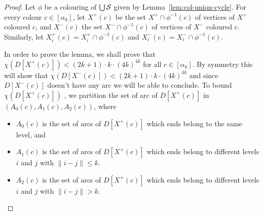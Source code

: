 \documentclass[utf8,10pt]{article}
\theoremstyle{plain}
\newtheorem{lemma}[theorem]{Lemma}
\theoremstyle{definition}
\theoremstyle{remark}
\newcommand{\dr}{ (2k+1)\cdot k \cdot (4k)^{4k}}
\begin{document}
\begin{proof}

%

Let $\phi$ be a colouring of $\bigcup {\cal S}$ given by Lemma~\ref{lem:col-union-cycle}.
For every colour $c\in [\alpha_k]$, let $X^+(c)$ be the set $X^+\cap \phi^{-1}(c)$ of vertices of $X^+$ coloured $c$, and $X^-(c)$ the set $X^-\cap \phi^{-1}(c)$ of vertices of $X^-$ coloured $c$. Similarly, let  $X^+_i(c)= X^+_i\cap \phi^{-1}(c)$ and $X^-_i(c)= X^-_i\cap \phi^{-1}(c)$.



In order to prove the lemma, we shall prove that $\chi(D[X^+(c)]) < \dr$ for all $c\in [\alpha_k]$.
By symmetry this will show that $\chi(D[X^-(c)]) < \dr$ and since $D[X^-(c)]$ doesn't have any arc we will
be able to conclude.
To bound $\chi(D[X^+(c)])$ , we partition the set of arc of $D[X^+(c)]$ in $(A_0(c),A_1(c), A_2(c))$, where
\begin{itemize}
	\item $A_0(c)$ is the set of arcs of $D[X^+(c)]$ which ends belong to the same level, and
	\item $A_1(c)$ is the set of arcs of $D[X^+(c)]$ which ends belong to different levels $i$ and $j$ with $ \| i - j\| \leq k$.	
	\item $A_2(c)$ is the set of arcs of $D[X^+(c)]$ which ends belong to different levels $i$ and $j$ with $ \| i - j\| > k$.
\end{itemize} 


\end{proof}
\end{document}
